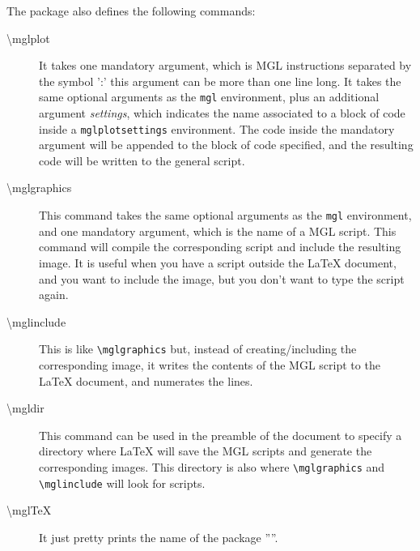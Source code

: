 \documentclass[12pt]{article}
\begin{document}
The package also defines the following commands:
\begin{description}
\item[\textbackslash{}mglplot]
	It takes one mandatory argument, which is MGL instructions separated by the symbol ':' this argument can be more than one line long. It takes the same optional arguments as the \texttt{mgl} environment, plus an additional argument \emph{settings}, which indicates the name associated to a block of code inside a \texttt{mglplotsettings} environment. The code inside the mandatory argument will be appended to the block of code specified, and the resulting code will be written to the general script.
\item[\textbackslash{}mglgraphics]
	This command takes the same optional arguments as the \texttt{mgl} environment, and one mandatory argument, which is the name of a MGL script. This command will compile the corresponding script and include the resulting image. It is useful when you have a script outside the LaTeX document, and you want to include the image, but you don't want to type the script again.
\item[\textbackslash{}mglinclude]
	This is like \texttt{\textbackslash{}mglgraphics} but, instead of creating/including the corresponding image, it writes the contents of the MGL script to the LaTeX document, and numerates the lines.
\item[\textbackslash{}mgldir]
	This command can be used in the preamble of the document to specify a directory where LaTeX will save the MGL scripts and generate the corresponding images. This directory is also where \texttt{\textbackslash{}mglgraphics} and \texttt{\textbackslash{}mglinclude} will look for scripts.
\item[\textbackslash{}mglTeX]
	It just pretty prints the name of the package ''\mglTeX''.
\end{description}
\end{document}
